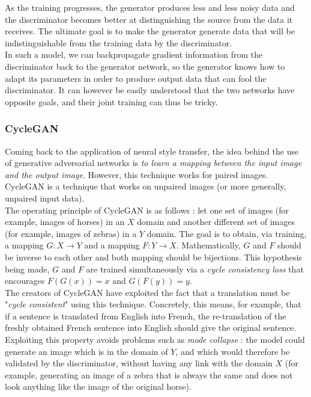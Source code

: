 \documentclass[twocolumn,superscriptaddress,aps,floatfix,nofootinbib]{revtex4-1}
\begin{document}
    As the training progresses, the generator produces less and less noisy data and the discriminator becomes better at distinguishing the source from the data it receives. The ultimate goal is to make the generator generate data that will be indistinguishable from the training data by the discriminator.\\
    
    In such a model, we can backpropagate gradient information from the discriminator back to the generator network, so the generator knows how to adapt its parameters in order to produce output data that can fool the discriminator. It can however be easily understood that the two networks have opposite goals, and their joint training can thus be tricky.
    
    \subsubsection{CycleGAN}
    
    Coming back to the application of neural style transfer, the idea behind the use of generative adversarial networks is \emph{to learn a mapping between the input image and the output image}. However, this technique works for paired images. CycleGAN is a technique that works on unpaired images (or more generally, unpaired input data).\\
    
    The operating principle of CycleGAN is as follows : let one set of images (for example, images of horses) in an $X$ domain and another different set of images (for example, images of zebras) in a $Y$ domain. The goal is to obtain, via training, a mapping $G : X \rightarrow Y$ and a mapping $F : Y \rightarrow X$. Mathematically, $G$ and $F$ should be inverse to each other and both mapping should be bijections. This hypothesis being made, $G$ and $F$ are trained simultaneously via a \emph{cycle consistency loss} that encourages $F(G(x)) = x$ and $G(F(y)) = y$.\\
    
    The creators of CycleGAN have exploited the fact that a translation must be "\emph{cycle consistent}" using this technique. Concretely, this means, for example, that if a sentence is translated from English into French, the re-translation of the freshly obtained French sentence into English should give the original sentence.\\
    
    Exploiting this property avoids problems such as \emph{mode collapse} : the model could generate an image which is in the domain of $Y$, and which would therefore be validated by the discriminator, without having any link with the domain $X$ (for example, generating an image of a zebra that is always the same and does not look anything like the image of the original horse).\\
    
\end{document}
